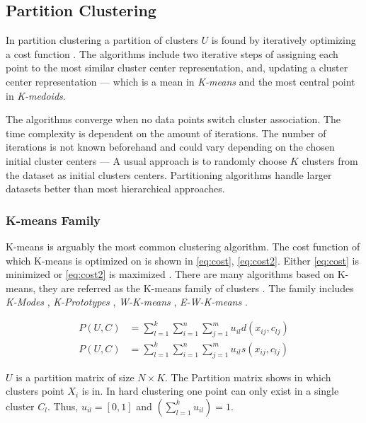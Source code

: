 \documentclass[../report.tex]{subfiles}
\begin{document}
\subsection{Partition Clustering}
\label{sub:part}
In partition clustering a partition of clusters $U$ is found by iteratively optimizing a cost function \cite{huang2005automated, Xu2015,Jain1999}. The algorithms include two iterative steps of assigning each point to the most similar cluster center representation, and, updating a cluster center representation --- which is a mean in \textit{K-means} and the most central point in \textit{K-medoids}.

The algorithms converge when no data points switch cluster association. The time complexity is dependent on the amount of iterations. The number of iterations is not known beforehand and could vary depending on the chosen initial cluster centers --- A usual approach is to randomly choose $K$ clusters from the dataset as initial clusters centers. Partitioning algorithms handle larger datasets better than most hierarchical approaches. 




\subsubsection{K-means Family}
K-means is arguably the most common clustering algorithm. The cost function of which K-means is optimized on is shown in \ref{eq:cost}, \ref{eq:cost2}. Either \ref{eq:cost} is minimized or \ref{eq:cost2} is maximized \cite{huang2005automated}.
There are many algorithms based on K-means, they are referred as the K-means family of clusters \cite{Huang1998}. The family includes \textit{K-Modes} \cite{Ng1999}, \textit{K-Prototypes} \cite{Huang97clusteringlarge}, \textit{W-K-means} \cite{huang2005automated}, \textit{E-W-K-means} \cite{Jing2007}.

\begin{align}
  \label{eq:cost}
  P(U,C) &= \sum^k_{l=1} \sum^n_{i=1} \sum^m_{j=1} u_{il} d(x_{ij},c_{lj}) \\
  \label{eq:cost2}
  P(U,C) &= \sum^k_{l=1} \sum^n_{i=1} \sum^m_{j=1} u_{il} s(x_{ij},c_{lj})
\end{align}

$U$ is a partition matrix of size $N \times K$. The Partition matrix shows in which clusters point $X_i$ is in. In hard clustering one point can only exist in a single cluster $C_l$. Thus, $u_{il} = [0,1]$ and $(\sum_{ l=1 }^{ k } u_{il}) = 1$.
\end{document}
